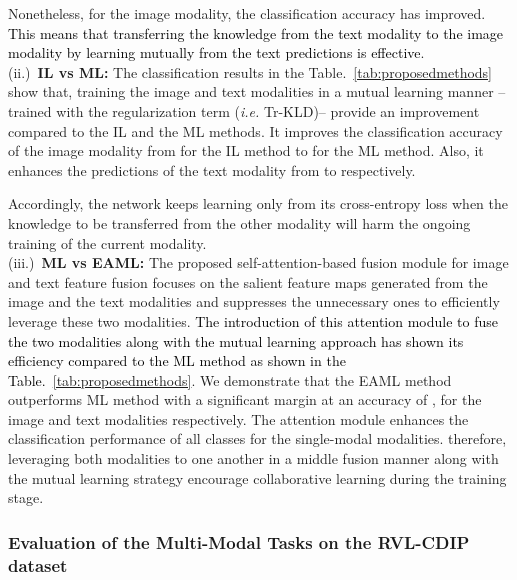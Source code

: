 \documentclass[twocolumn]{svjour3}
\newcommand{\ie}{\textit{i.e. }}
\begin{document}
Nonetheless, for the image modality, the classification accuracy has improved. \textcolor{black}{This means that transferring the knowledge from the text modality to the image modality by learning mutually from the text predictions is effective}.
\\
(ii.)\noindent~\textbf{IL vs ML:}
The classification results in the Table.~\ref{tab:proposedmethods} show that, training the image and text modalities in a mutual learning manner --trained with the regularization term (\ie Tr-KLD)-- provide an improvement compared to the IL and the ML methods. It improves the classification accuracy of the image modality from  for the IL method to  for the ML method. Also, it enhances the predictions of the text modality from  to  respectively.

Accordingly, the network keeps learning only from its cross-entropy loss  when the knowledge to be transferred from the other modality will harm the ongoing training of the current modality.
\\
(iii.)\noindent~\textbf{ML vs EAML:}
The proposed self-attention-based fusion module for image and text feature fusion focuses on the salient feature maps generated from the image and the text modalities and suppresses the unnecessary ones to efficiently leverage these two modalities. \textcolor{black}{The introduction of this attention module to fuse the two modalities along with the mutual learning approach has shown its efficiency compared to the ML method as shown in the Table.~\ref{tab:proposedmethods}}. We demonstrate that the EAML method outperforms ML method with a significant margin at an accuracy of ,  for the image and text modalities respectively. The attention module enhances the classification performance of all classes for the single-modal modalities. therefore, leveraging both modalities to one another in a middle fusion manner along with the mutual learning strategy encourage collaborative learning during the training stage. 



\subsubsection{Evaluation of the Multi-Modal Tasks on the RVL-CDIP dataset}
\end{document}
